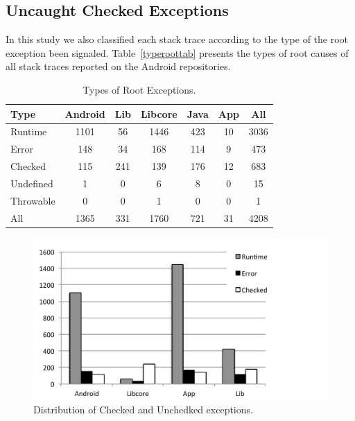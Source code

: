 \documentclass[conference]{IEEEtran}
\begin{document}
\subsection{Uncaught Checked Exceptions}

In this study we also classified each stack trace according to the type of the root exception been signaled. Table~\ref{typeroottab} presents the types of root causes of all stack traces reported on the Android repositories. 

\begin{table}
\centering
\begin{tabular}{lcccccc}
    \hline
    \bfseries{Type} & \bfseries{Android} & \bfseries{Lib} & \bfseries{Libcore} & \bfseries{Java} & \bfseries{App} & \bfseries{All}\\
    \hline

Runtime	&	1101	&	56	&	1446	&	423	&	10	&	3036	\\
Error	&	148	&	34	&	168	&	114	&	9	&	473	\\
Checked	&	115	&	241	&	139	&	176	&	12	&	683	\\
Undefined	&	1	&	0	&	6	&	8	&	0	&	15	\\
Throwable	&	0	&	0	&	1	&	0	&	0	&	1	\\

    \hline
 All  &	1365	&	331	&	1760	&	721	&	31	&	4208	\\
    \hline
  \end{tabular}
\caption{Types of Root Exceptions.}
  \label{fig:typeroottab}
\end{table}


\begin{figure}
\centering
\includegraphics[scale=0.3]{chart_exceptiontypes.pdf}
\caption{Distribution of Checked and Unchedked exceptions.}
\label{fig:typeroot}
\end{figure}
\end{document}
